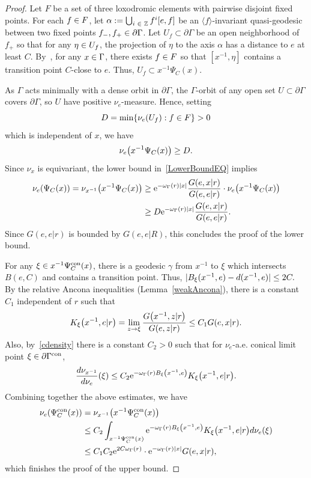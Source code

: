\documentclass[10pt]{amsart}
\theoremstyle{definition}\newtheorem{defi}[theo]{Definition}\newtheorem{rema}[theo]{Remark}\newtheorem{exam}[theo]{Example}\newtheorem{exem}[theo]{Example}\newtheorem{nota}[theo]{Notation}
\newcommand{\pG}{\partial{\Gamma}}
\newcommand{\Z}{\mathbb{Z}}
\newcommand{\rme}{\mathrm{e}}
\DeclareMathOperator{\con}{con}
\let\originalleft\left
\let\originalright\right
\renewcommand{\left}{\mathopen{}\mathclose\bgroup\originalleft}
\renewcommand{\right}{\aftergroup\egroup\originalright}
\let\oldin\in
\renewcommand{\in}{\mathchoice{\oldin}{\oldin}{\,\oldin\,}{\,\oldin\,}}
\let\oldge\ge
\renewcommand{\ge}{\mathchoice{\oldge}{\oldge}{\,\oldge\,}{\,\oldge\,}}
\let\oldle\le
\renewcommand{\le}{\mathchoice{\oldle}{\oldle}{\,\oldle\,}{\,\oldle\,}}
\renewcommand*{\to}{\mathchoice{\longrightarrow}{\rightarrow}{\rightarrow}{\rightarrow}}
\begin{document}
\begin{proof}
Let $F$ be a set of three loxodromic elements with pairwise disjoint fixed points. For each $f\in F$, let $\alpha:=\bigcup_{i\in \Z} f^i[e,f]$ be an $\langle f\rangle$-invariant quasi-geodesic between two fixed points $f_-,f_+\in\pG$. Let $U_f\subset \pG$ be an open neighborhood of $f_+$ so that for any $\eta\in U_f$, the projection of $\eta$ to the axis $\alpha$ has a distance to $e$ at least $C$. By~\cite[Lemma~2.4]{DWY}, for any $x\in \Gamma$, there exists $f\in F$ so that $[x^{-1},\eta]$ contains a transition point $C$-close to $e$. Thus, $U_f\subset x^{-1}\Psi_{C}(x)$.

As $\Gamma$ acts minimally with a dense orbit in $\pG$, the $\Gamma$-orbit of any open set $U\subset \pG$ covers $\pG$, so $U$ have positive $\nu_e$-measure. Hence, setting
\[
D=\min\{\nu_e(U_f): f\in F\}>0
\]
which is independent of $x$, we have
\[
\nu_e\left(x^{-1}\Psi_{C}(x)\right) \ge D.
\]
Since $\nu_x $ is equivariant, the lower bound in~\eqref{LowerBoundEQ} implies
\begin{align*}
\nu_e(\Psi_{C}(x))={\nu_{x^{-1}}\left(x^{-1}\Psi_{C}(x)\right)}&\ge \rme^{-\omega_\Gamma(r) |x|}\frac{G(e,x|r) }{G(e,e|r)}\cdot {\nu_e\left(x^{-1}\Psi_C(x)\right)}\\
&\ge D \rme^{-\omega_\Gamma(r) |x|}\frac{G(e,x|r)}{G(e,e|r)}.
\end{align*}
Since $G(e,e|r)$ is bounded by $G(e,e|R)$, this concludes the proof of the lower bound.

For any $\xi \in x^{-1} \Psi^{\con}_C(x)$, there is a geodesic $\gamma$ from $x^{-1}$ to $\xi$ which intersects $B(e, C)$ and contains a transition point. Thus, $|B_\xi(x^{-1},e)
- d(x^{-1}, e)| \le 2C.$ By the relative Ancona inequalities (Lemma~\ref{weakAncona}), there is a constant $C_1$ independent of $r$ such that
\[
K_\xi\left(x^{-1}, e|r\right) = \lim_{z\to \xi}\frac{G\left(x^{-1},z|r\right)}{G(e,z|r)}
\le C_1 G(e,x|r).
\]
Also, by~\eqref{cdensity} there is a constant $C_2>0$ such that for $\nu_e$-a.e. conical limit point $\xi \in \pG^{\con}$,
\[
\frac{d\nu_{x^{-1}}}{d\nu_e}(\xi) \le C_2 \rme^{-\omega_\Gamma(r) B_\xi\left(x^{-1},e\right)} K_\xi\left(x^{-1}, e| r\right).
\]
Combining together the above estimates, we have
\begin{align*}
\nu_e(\Psi^{\con}_C(x)) & = \nu_{x^{-1}}\left(x^{-1}\Psi^{\con}_C(x)\right) \\
& \le C_2\int_{x^{-1}\Psi^{\con}_C(x)} \rme^{-\omega_\Gamma(r) B_\xi\left(x^{-1},e\right)} K_\xi\left(x^{-1}, e|r\right) d \nu_e(\xi) \\
& \leq C_1C_2 \rme^{2C\omega_\Gamma(r)} \cdot \rme^{-\omega_\Gamma(r) |x|} G(e,x|r),
\end{align*}
which finishes the proof of the upper bound.
\end{proof}
\end{document}
